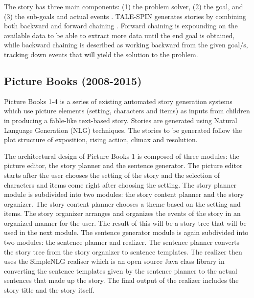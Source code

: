 The story has three main components: (1) the problem solver, (2) the goal, and (3) the sub-goals and actual events \cite{Meehan1977}. TALE-SPIN generates stories by combining both backward and forward chaining \cite{Meehan1977}. Forward chaining is expounding on the available data to be able to extract more data until the end goal is obtained, while backward chaining is described as working backward from the given goal/s, tracking down events that will yield the solution to the problem.

\subsection{Picture Books (2008-2015)}
Picture Books 1-4 is a series of existing automated story generation systems which use picture elements (setting, characters and items) as inputs from children in producing a fable-like text-based story. Stories are generated using Natural Language Generation (NLG) techniques. The stories to be generated follow the plot structure of exposition, rising action, climax and resolution.

The architectural design of Picture Books 1 is composed of three modules: the picture editor, the story planner and the sentence generator. The picture editor starts after the user chooses the setting of the story and the selection of characters and items come right after choosing the setting. The story planner module is subdivided into two modules: the story content planner and the story organizer. The story content planner chooses a theme based on the setting and items. The story organizer arranges and organizes the events of the story in an organized manner for the user. The result of this will be a story tree that will be used in the next module.  The sentence generator module is again subdivided into two modules: the sentence planner and realizer. The sentence planner converts the story tree from the story organizer to sentence templates. The realizer then uses the SimpleNLG realiser which is an open source Java class library in converting the sentence templates given by the sentence planner to the actual sentences that made up the story. The final output of the realizer includes the story title and the story itself.

